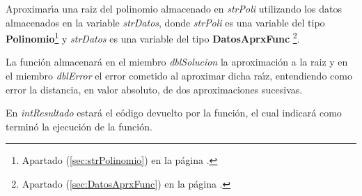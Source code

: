 Aproximar\'{\i}a una raiz del polinomio almacenado en \emph{strPoli} utilizando
los datos almacenados en la variable \emph{strDatos}, donde \emph{strPoli} es
una variable del tipo \textbf{Polinomio}\footnote{Apartado
(\ref{sec:strPolinomio}) en la p\'agina \pageref{sec:strPolinomio}.} y
\emph{strDatos} es una variable del tipo \textbf{DatosAprxFunc}%
\footnote{Apartado (\ref{sec:DatosAprxFunc}) en la p\'agina
\pageref{sec:DatosAprxFunc}.}.\newline

La funci\'on almacenar\'a en el miembro \emph{dblSolucion} la aproximaci\'on a
la raiz y en el miembro \emph{dblError} el error cometido al aproximar dicha
ra\'{\i}z, entendiendo como error la distancia, en valor absoluto, de dos
aproximaciones sucesivas.\newline

En \emph{intResultado} estar\'a el c\'odigo devuelto por la funci\'on, el cual
indicar\'a como termin\'o la ejecuci\'on de la funci\'on.


